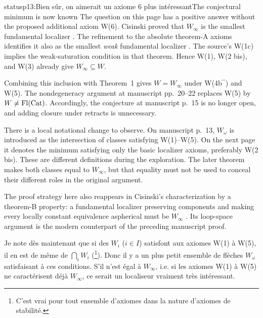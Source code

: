 \begin{dcomment}{status}{p13:Bien sûr, on aimerait un axiome 6 plus intéressant}{The conjectural minimum is now known}
The question on this page has a positive answer without the proposed additional axiom W(6). Cisinski proved that \(W_\infty\) is the smallest fundamental localizer \citep[Theorem~2.2.11]{Cisinski2004Minimal}. The refinement to the absolute theorem-A axioms identifies it also as the smallest \emph{weak} fundamental localizer \citep[Theorem~6.1.18]{Cisinski2006}. The source's W(1c) implies the weak-saturation condition in that theorem. Hence W(1), W(2 bis), and W(3) already give \(W_\infty\subseteq W\).

Combining this inclusion with Theorem~1 gives \(W=W_\infty\) under W(4b\(^{\prime\prime}\)) and W(5). The nondegeneracy argument at manuscript pp.~20--22 replaces W(5) by \(W\ne\mathrm{Fl}(\mathrm{Cat})\). Accordingly, the conjecture at manuscript p.~15 is no longer open, and adding closure under retracts is unnecessary.

There is a local notational change to observe. On manuscript p.~13, \(W_\omega\) is introduced as the intersection of classes satisfying W(1)--W(5). On the next page it denotes the minimum satisfying only the basic localizer axioms, preferably W(2 bis). These are different definitions during the exploration. The later theorem makes both classes equal to \(W_\infty\), but that equality must not be used to conceal their different roles in the original argument.

The proof strategy here also reappears in Cisinski's characterization by a theorem-B property: a fundamental localizer preserving components and making every locally constant equivalence aspherical must be \(W_\infty\) \citep[Theorem~2.3.6]{Cisinski2004Minimal}. Its loop-space argument is the modern counterpart of the preceding manuscript proof.
\end{dcomment}



Je note dès maintenant que si des $W_i$ ($i \in I$) satisfont aux axiomes W(1) à W(5), il en est de même de $\bigcap_i W_i$ (\footnote[30]{C'est vrai pour tout ensemble d'axiomes dans la nature d'axiomes de stabilité.}). Donc il y a un plus petit ensemble de flèches $W_\omega$ satisfaisant à ces conditions. S'il n'est égal à $W_\infty$, i.e. si les axiomes W(1) à W(5) ne caractérisent déjà $W_\infty$, ce serait un localiseur vraiment très intéressant.

